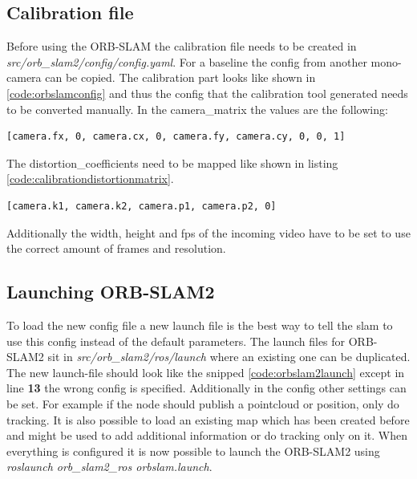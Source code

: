 \subsection{Calibration file}\label{ref:calibrationorbslam}
Before using the ORB-SLAM the calibration file needs to be created in \textit{src/orb\_slam2/config/config.yaml}. For a baseline the config from another mono-camera can be copied. The calibration part looks like shown in \ref{code:orbslamconfig} and thus the config that the calibration tool generated needs to be converted manually. In the camera\_matrix the values are the following:\newline
\begin{lstlisting}[language=XML,caption={Matrix listing},label={code:calibrationmatrix}]
	  	[camera.fx, 0, camera.cx, 0, camera.fy, camera.cy, 0, 0, 1]
\end{lstlisting}
The distortion\_coefficients need to be mapped like shown in listing \ref{code:calibrationdistortionmatrix}.\newline
\begin{lstlisting}[language=XML,caption={Matrix listing},label={code:calibrationdistortionmatrix}]
	  	[camera.k1, camera.k2, camera.p1, camera.p2, 0]
\end{lstlisting}
Additionally the width, height and \gls{fps} of the incoming video have to be set to use the correct amount of frames and resolution.\newline


\subsection{Launching ORB-SLAM2}
To load the new config file a new launch file is the best way to tell the \gls{slam} to use this config instead of the default parameters. The launch files for ORB-SLAM2 sit in \textit{src/orb\_slam2/ros/launch} where an existing one can be duplicated. The new launch-file should look like the snipped \ref{code:orbslam2launch} except in line \textbf{13} the wrong config is specified. Additionally in the config other settings can be set. For example if the node should publish a pointcloud or position, only do tracking. It is also possible to load an existing map which has been created before and might be used to add additional information or do tracking only on it. When everything is configured it is now possible to launch the ORB-SLAM2 using \textit{roslaunch orb\_slam2\_ros orbslam.launch}. \newline



